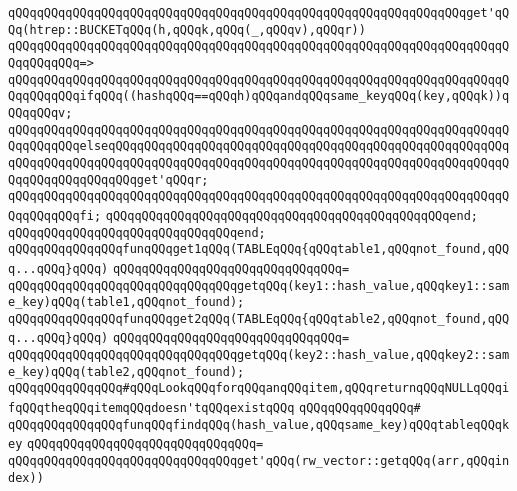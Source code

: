 \verb|qQQqqQQqqQQqqQQqqQQqqQQqqQQqqQQqqQQqqQQqqQQqqQQqqQQqqQQqqQQqqQQqget'qQQq(htrep::BUCKETqQQq(h,qQQqk,qQQq(_,qQQqv),qQQqr))|\newline
\verb|qQQqqQQqqQQqqQQqqQQqqQQqqQQqqQQqqQQqqQQqqQQqqQQqqQQqqQQqqQQqqQQqqQQqqQQqqQQqqQQq=>|\newline
\verb|qQQqqQQqqQQqqQQqqQQqqQQqqQQqqQQqqQQqqQQqqQQqqQQqqQQqqQQqqQQqqQQqqQQqqQQqqQQqqQQqifqQQq((hashqQQq==qQQqh)qQQqandqQQqsame_keyqQQq(key,qQQqk))qQQqqQQqv;|\newline
\verb|qQQqqQQqqQQqqQQqqQQqqQQqqQQqqQQqqQQqqQQqqQQqqQQqqQQqqQQqqQQqqQQqqQQqqQQqqQQqqQQqelseqQQqqQQqqQQqqQQqqQQqqQQqqQQqqQQqqQQqqQQqqQQqqQQqqQQqqQQqqQQqqQQqqQQqqQQqqQQqqQQqqQQqqQQqqQQqqQQqqQQqqQQqqQQqqQQqqQQqqQQqqQQqqQQqqQQqqQQqqQQqqQQqget'qQQqr;|\newline
\verb|qQQqqQQqqQQqqQQqqQQqqQQqqQQqqQQqqQQqqQQqqQQqqQQqqQQqqQQqqQQqqQQqqQQqqQQqqQQqqQQqfi;|\newline
\verb|qQQqqQQqqQQqqQQqqQQqqQQqqQQqqQQqqQQqqQQqqQQqqQQqend;|\newline
\verb|qQQqqQQqqQQqqQQqqQQqqQQqqQQqqQQqend;|\newline
\newline
\verb|qQQqqQQqqQQqqQQqfunqQQqget1qQQq(TABLEqQQq{qQQqtable1,qQQqnot_found,qQQq...qQQq}qQQq)|\newline
\verb|qQQqqQQqqQQqqQQqqQQqqQQqqQQqqQQq=|\newline
\verb|qQQqqQQqqQQqqQQqqQQqqQQqqQQqqQQqgetqQQq(key1::hash_value,qQQqkey1::same_key)qQQq(table1,qQQqnot_found);|\newline
\newline
\verb|qQQqqQQqqQQqqQQqfunqQQqget2qQQq(TABLEqQQq{qQQqtable2,qQQqnot_found,qQQq...qQQq}qQQq)|\newline
\verb|qQQqqQQqqQQqqQQqqQQqqQQqqQQqqQQq=|\newline
\verb|qQQqqQQqqQQqqQQqqQQqqQQqqQQqqQQqgetqQQq(key2::hash_value,qQQqkey2::same_key)qQQq(table2,qQQqnot_found);|\newline
\newline
\verb|qQQqqQQqqQQqqQQq#qQQqLookqQQqforqQQqanqQQqitem,qQQqreturnqQQqNULLqQQqifqQQqtheqQQqitemqQQqdoesn'tqQQqexistqQQq|\newline
\verb|qQQqqQQqqQQqqQQq#|\newline
\verb|qQQqqQQqqQQqqQQqfunqQQqfindqQQq(hash_value,qQQqsame_key)qQQqtableqQQqkey|\newline
\verb|qQQqqQQqqQQqqQQqqQQqqQQqqQQqqQQq=|\newline
\verb|qQQqqQQqqQQqqQQqqQQqqQQqqQQqqQQqget'qQQq(rw_vector::getqQQq(arr,qQQqindex))|\newline
